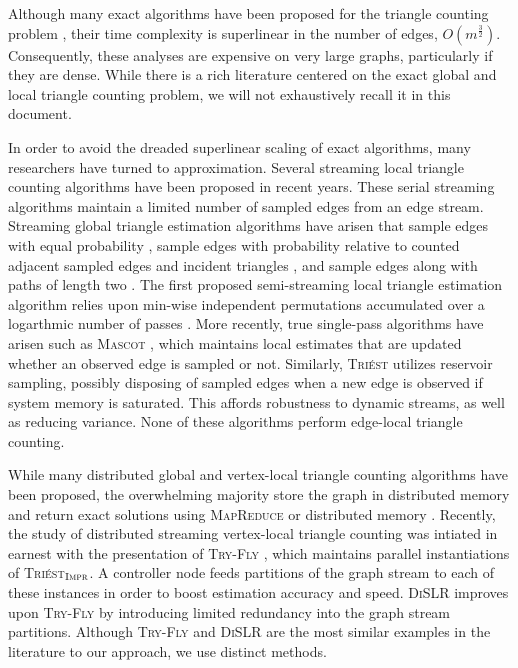 \documentclass[10]{article}
\newcommand{\algoname}[1]{\textnormal{\textsc{#1}}}
\begin{document}
Although many exact algorithms have been proposed for the triangle counting problem \cite{tsourakakis2008fast, becchetti2010efficient, chu2011triangle, suri2011counting, wolf2017fast}, their time complexity is superlinear in the number of edges, $O(m^{
\frac{3}{2}})$.
Consequently, these analyses are expensive on very large graphs, particularly if they are dense.
While there is a rich literature centered on the exact global and local triangle counting problem, we will not exhaustively recall it in this document.

In order to avoid the dreaded superlinear scaling of exact algorithms, many researchers have turned to approximation.
Several streaming local triangle counting algorithms have been proposed in recent years.
These serial streaming algorithms  maintain a limited number of sampled edges from an edge stream.
Streaming global triangle estimation algorithms have arisen that sample edges with equal probability \cite{tsourakakis2009doulion}, sample edges with probability relative to counted adjacent sampled edges and incident triangles \cite{ahmed2017sampling}, and sample edges along with paths of length two \cite{jha2013space}. 
The first proposed semi-streaming local triangle estimation algorithm relies upon min-wise independent permutations accumulated over a logarthmic number of passes \cite{becchetti2008efficient}. 
More recently, true single-pass algorithms have arisen such as \algoname{Mascot} \cite{lim2015mascot}, which maintains local estimates that are updated whether an observed edge is sampled or not.
Similarly, \algoname{Tri\'est} \cite{stefani2017triest} utilizes reservoir sampling, possibly disposing of sampled edges when a new edge is observed if system memory is saturated.
This affords robustness to dynamic streams, as well as reducing variance.
None of these algorithms perform edge-local triangle counting.

While many distributed global and vertex-local triangle counting algorithms have been proposed, the overwhelming majority store the graph in distributed memory and return exact solutions using \algoname{MapReduce} \cite{suri2011counting} or distributed memory \cite{arifuzzaman2013patric, pearce2017triangle}.
Recently, the study of distributed streaming vertex-local triangle counting was intiated in earnest with the presentation of \algoname{Try-Fly} \cite{shin2018tri}, which maintains parallel instantiations of \algoname{Tri\'est$_{\algoname{Impr}}$}.
A controller node feeds partitions of the graph stream to each of these instances in order to boost estimation accuracy and speed.
\algoname{DiSLR} \cite{shin2018dislr} improves upon \algoname{Try-Fly} by introducing limited redundancy into the graph stream partitions.
Although \algoname{Try-Fly} and \algoname{DiSLR} are the most similar examples in the literature to our approach, we use distinct methods.
\end{document}
